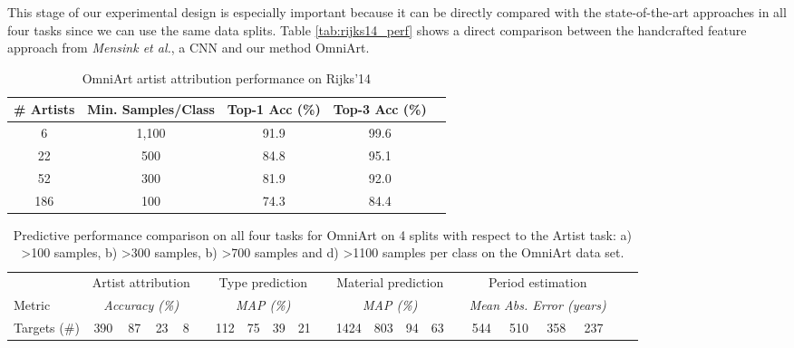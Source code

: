 \documentclass[sigconf]{acmart}
\begin{document}
This stage of our experimental design is especially important because it can be directly compared with the state-of-the-art approaches in all four tasks since we can use the same data splits. Table \ref{tab:rijks14_perf} shows a direct comparison between the handcrafted feature approach from \textit{Mensink et al.}, a CNN and our method OmniArt.

\begin{table}
  \caption{OmniArt artist attribution performance on Rijks'14 \label{tab:rijks14_artist_perf}}
  
  \begin{tabular}{ccccc}
    \toprule
    \# Artists  & Min. Samples/Class & Top-1 Acc (\%) & Top-3 Acc (\%) \\
    \midrule
    6           & 1,100              & 91.9           & 99.6           \\
    22          &   500              & 84.8           & 95.1           \\
    52          &   300              & 81.9           & 92.0           \\
  	186         &   100              & 74.3           & 84.4           \\
    \bottomrule
  \end{tabular}
\end{table}\begin{table*}[]
\centering
\caption{Predictive performance comparison on all four tasks for OmniArt on 4 splits with respect to the Artist task: a) >100 samples, b) >300 samples, b) >700 samples and  d) >1100 samples per class on the OmniArt data set. }
\label{tab:omniart_perf}
\begin{tabular}{lccccccccccccccccccccc}                                                                                                                                                                                                                     \toprule
             & \multicolumn{4}{c}{Artist attribution}     &&\multicolumn{4}{c}{Type prediction}    && \multicolumn{4}{c}{Material prediction}  && \multicolumn{4}{c}{Period estimation}    \\
Metric       & \multicolumn{4}{c}{\textit{Accuracy (\%)}} &&\multicolumn{4}{c}{\textit{MAP (\%)}}  && \multicolumn{4}{c}{\textit{MAP (\%)}}    && \multicolumn{4}{c}{\textit{Mean Abs. Error (years)}} \\\midrule
Targets (\#) & 390  & 87    & 23   & 8                    && 112  & 75   & 39    & 21               && 1424   & 803    & 94      & 63            && 544   & 510    & 358    & 237                \\\midrule


\end{tabular}
\end{table*}
\end{document}
